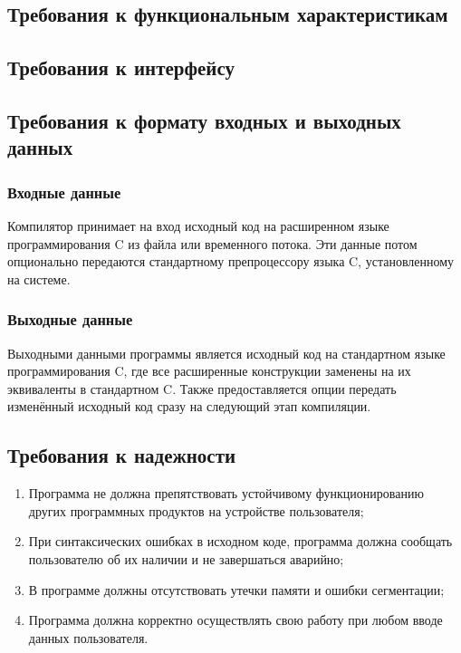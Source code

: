 \subsection{Требования к функциональным характеристикам}


\subsection{Требования к интерфейсу}


\subsection{Требования к формату входных и выходных данных}

\subsubsection{Входные данные}

Компилятор принимает на вход исходный код на расширенном языке программирования C из файла или временного потока.
Эти данные потом опционально передаются стандартному препроцессору языка C, установленному на системе.

\subsubsection{Выходные данные}

Выходными данными программы является исходный код на стандартном языке программирования C, где все расширенные конструкции заменены на их эквиваленты в стандартном C.
Также предоставляется опции передать изменённый исходный код сразу на следующий этап компиляции.

\subsection{Требования к надежности}

\begin{enumerate}
  \item Программа не должна препятствовать устойчивому функционированию других программных продуктов на устройстве пользователя;
  \item При синтаксических ошибках в исходном коде, программа должна сообщать пользователю об их наличии и не завершаться аварийно;
  \item В программе должны отсутствовать утечки памяти и ошибки сегментации;
  \item Программа должна корректно осуществлять свою работу при любом вводе данных пользователя.
\end{enumerate}
